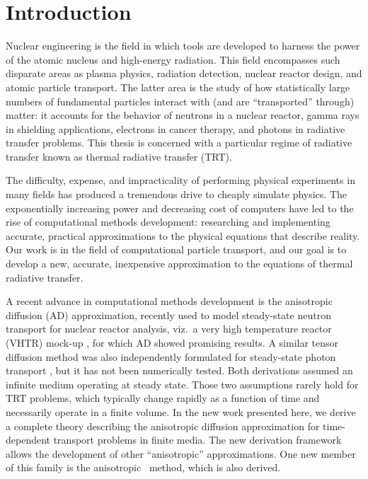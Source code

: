 
\chapter{Introduction}\label{chap:introduction}

Nuclear engineering is the field in which tools are developed to harness the
power of the
atomic nucleus and high-energy radiation. This field encompasses such
disparate areas as plasma physics, radiation detection, nuclear reactor design,
and atomic particle transport. The latter area is the study of how
statistically large numbers of fundamental particles interact with (and are
``transported'' through) matter: it
accounts for the behavior of neutrons in a nuclear reactor,
gamma rays in shielding applications, electrons in cancer therapy, and photons
in radiative transfer problems. This thesis is concerned with a
particular regime of radiative transfer known as thermal radiative transfer
(TRT).

The difficulty, expense, and impracticality of performing physical
experiments in many fields has produced a tremendous drive to cheaply
simulate physics. The exponentially increasing power and decreasing cost of
computers have led to the rise of computational methods development:
researching and implementing accurate, practical approximations to the physical
equations that describe reality. Our work is in the field of computational
particle transport, and our goal is to develop a new, accurate, inexpensive
approximation to the equations of thermal radiative transfer.

A recent advance in computational methods development is the anisotropic
diffusion (AD)
approximation, recently used to model steady-state neutron transport for
nuclear reactor analysis, viz.~a very high temperature reactor
(VHTR) mock-up \cite{Lar2009c,Tra2011}, for which AD showed promising
results. A similar tensor diffusion
method was also independently formulated for steady-state photon transport
\cite{Mor2007}, but it has not been numerically tested.
Both derivations assumed an infinite medium operating at steady state.
Those two assumptions rarely hold for TRT problems, which typically change
rapidly as a
function of time and necessarily operate in a finite volume. In the new
work presented here, we derive a complete theory describing the anisotropic
diffusion approximation for time-dependent transport problems in finite media.
The new derivation framework allows the development of other ``anisotropic''
approximations. One new member of this family is the anisotropic
\Pone\ method, which is also derived.

